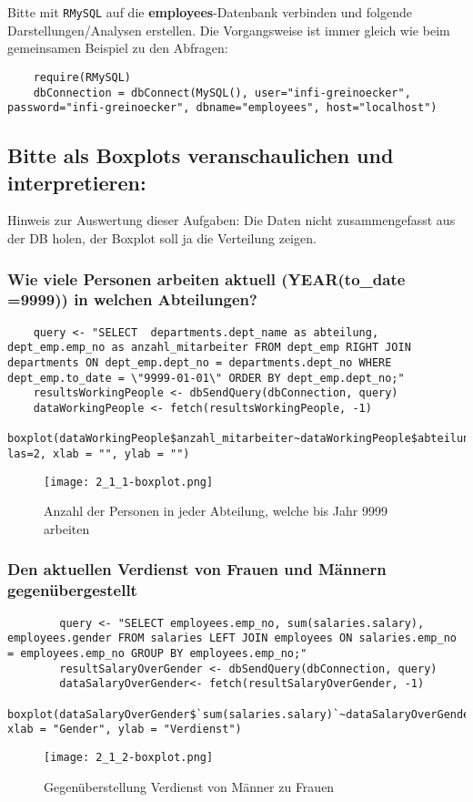 \documentclass{article}
\begin{document}
Bitte mit \texttt{RMySQL} auf die \textbf{employees}-Datenbank verbinden und folgende Darstellungen/Analysen erstellen. Die Vorgangsweise ist immer gleich wie beim gemeinsamen Beispiel zu den Abfragen:
\begin{lstlisting}
	require(RMySQL)
	dbConnection = dbConnect(MySQL(), user="infi-greinoecker", password="infi-greinoecker", dbname="employees", host="localhost")
\end{lstlisting}

\subsection{Bitte als Boxplots veranschaulichen und interpretieren:}

Hinweis zur Auswertung dieser Aufgaben: Die Daten nicht zusammengefasst aus der DB holen, der Boxplot soll ja die Verteilung zeigen.

\subsubsection{Wie viele Personen arbeiten aktuell (YEAR(to\_date =9999)) in welchen Abteilungen?}
	\begin{lstlisting}
	query <- "SELECT  departments.dept_name as abteilung, dept_emp.emp_no as anzahl_mitarbeiter FROM dept_emp RIGHT JOIN departments ON dept_emp.dept_no = departments.dept_no WHERE dept_emp.to_date = \"9999-01-01\" ORDER BY dept_emp.dept_no;"
	resultsWorkingPeople <- dbSendQuery(dbConnection, query) 
	dataWorkingPeople <- fetch(resultsWorkingPeople, -1)
	boxplot(dataWorkingPeople$anzahl_mitarbeiter~dataWorkingPeople$abteilung, las=2, xlab = "", ylab = "")
	\end{lstlisting}
\begin{figure}[H]
	\begin{center}
		
		\texttt{[image: 2\_1\_1-boxplot.png]}
		\caption{Anzahl der Personen in jeder Abteilung, welche bis Jahr 9999 arbeiten}
	\end{center}
\end{figure}
\subsubsection{Den aktuellen Verdienst von Frauen und Männern gegenübergestellt}
	\begin{lstlisting}
		query <- "SELECT employees.emp_no, sum(salaries.salary), employees.gender FROM salaries LEFT JOIN employees ON salaries.emp_no = employees.emp_no GROUP BY employees.emp_no;"
		resultSalaryOverGender <- dbSendQuery(dbConnection, query)
		dataSalaryOverGender<- fetch(resultSalaryOverGender, -1)
		boxplot(dataSalaryOverGender$`sum(salaries.salary)`~dataSalaryOverGender$gender, xlab = "Gender", ylab = "Verdienst")
	\end{lstlisting}
\begin{figure}[H]
	\begin{center}
		\texttt{[image: 2\_1\_2-boxplot.png]}
		\caption{Gegenüberstellung Verdienst von Männer zu Frauen}
	\end{center}
\end{figure}
\end{document}
